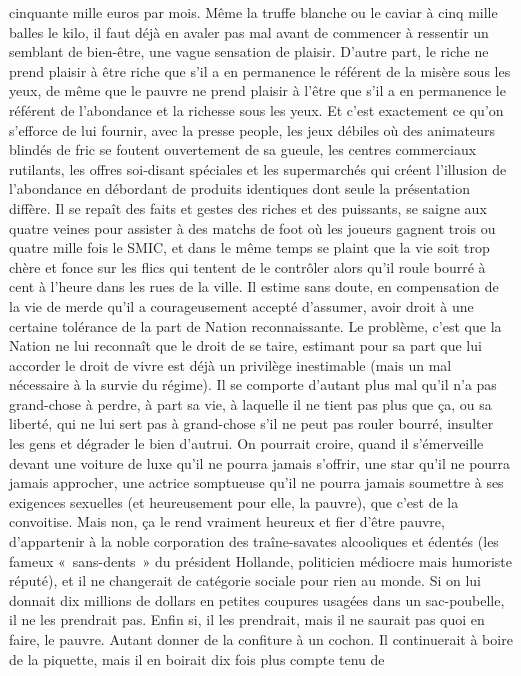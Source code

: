 cinquante mille euros par mois. Même la truffe blanche ou le caviar à cinq mille balles le kilo, il faut déjà en avaler pas mal avant de commencer à ressentir un semblant de bien-être, une vague sensation de plaisir. D’autre part, le riche ne prend plaisir à être riche que s’il a en permanence le référent de la misère sous les yeux, de même que le pauvre ne prend plaisir à l’être que s’il a en permanence le référent de l’abondance et la richesse sous les yeux. Et c’est exactement ce qu’on s’efforce de lui fournir, avec la presse people, les jeux débiles où des animateurs blindés de fric se foutent ouvertement de sa gueule, les centres commerciaux rutilants, les offres soi-disant spéciales et les supermarchés qui créent l’illusion de l’abondance en débordant de produits identiques dont seule la présentation diffère. Il se repaît des faits et gestes des riches et des puissants, se saigne aux quatre veines pour assister à des matchs de foot où les joueurs gagnent trois ou quatre mille fois le SMIC, et dans le même temps se plaint que la vie soit trop chère et fonce sur les flics qui tentent de le contrôler alors qu’il roule bourré à cent à l’heure dans les rues de la ville. Il estime sans doute, en compensation de la vie de merde qu’il a courageusement accepté d’assumer, avoir droit à une certaine tolérance de la part de Nation reconnaissante. Le problème, c’est que la Nation ne lui reconnaît que le droit de se taire, estimant pour sa part que lui accorder le droit de vivre est déjà un privilège inestimable (mais un mal nécessaire à la survie du régime). Il se comporte d’autant plus mal qu’il n’a pas grand-chose à perdre, à part sa vie, à laquelle il ne tient pas plus que ça, ou sa liberté, qui ne lui sert pas à grand-chose s’il ne peut pas rouler bourré, insulter les gens et dégrader le bien d’autrui. On pourrait croire, quand il s’émerveille devant une voiture de luxe qu’il ne pourra jamais s’offrir, une star qu’il ne pourra jamais approcher, une actrice somptueuse qu’il ne pourra jamais soumettre à ses exigences sexuelles (et heureusement pour elle, la pauvre), que c’est de la convoitise. Mais non, ça le rend vraiment heureux et fier d’être pauvre, d’appartenir à la noble corporation des traîne-savates alcooliques et édentés (les fameux «~sans-dents~» du président Hollande, politicien médiocre mais humoriste réputé), et il ne changerait de catégorie sociale pour rien au monde. Si on lui donnait dix millions de dollars en petites coupures usagées dans un sac-poubelle, il ne les prendrait pas. Enfin si, il les prendrait, mais il ne saurait pas quoi en faire, le pauvre. Autant donner de la confiture à un cochon. Il continuerait à boire de la piquette, mais il en boirait dix fois plus compte tenu de 